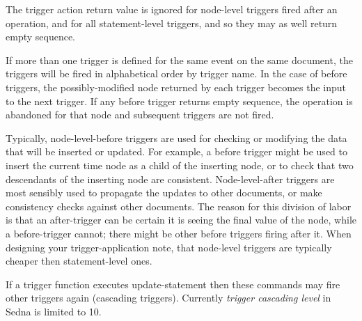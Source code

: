 \documentclass[a4paper,12pt]{article}
\begin{document}
The trigger action return value is ignored for node-level triggers fired after an operation, and for all statement-level triggers, and so they may as well return empty sequence.

If more than one trigger is defined for the same event on the same document, the triggers will be fired in alphabetical order by trigger name. In the case of before triggers, the possibly-modified node returned by each trigger becomes the input to the next trigger. If any before trigger returns empty sequence, the operation is abandoned for that node and subsequent triggers are not fired.


Typically, node-level-before triggers are used for checking or modifying the data that will be inserted or updated. For example, a before trigger might be used to insert the current time node as a child of the inserting node, or to check that two descendants of the inserting node are consistent. Node-level-after triggers are most sensibly used to propagate the updates to other documents, or make consistency checks against other documents. The reason for this division of labor is that an after-trigger can be certain it is seeing the final value of the node, while a before-trigger cannot; there might be other before triggers firing after it. When designing your trigger-application note, that node-level triggers are typically cheaper then statement-level ones.

If a trigger function executes update-statement then these commands may fire other triggers again (cascading triggers). Currently \emph{trigger cascading level} in Sedna is limited to 10.
\end{document}
